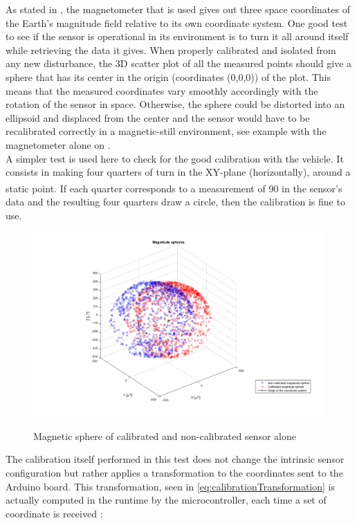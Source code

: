 As stated in , the magnetometer that is used gives out three space coordinates of the Earth's magnitude field relative to its own coordinate system. One good test to see if the sensor is operational in its environment is to turn it all around itself while retrieving the data it gives. When properly calibrated and isolated from any new disturbance, the 3D scatter plot of all the measured points should give a sphere that has its center in the origin (coordinates (0,0,0)) of the plot. This means that the measured coordinates vary smoothly accordingly with the rotation of the sensor in space. Otherwise, the sphere could be distorted into an ellipsoid and displaced from the center and the sensor would have to be recalibrated correctly in a magnetic-still environment, see example with the magnetometer alone on .\\
A simpler test is used here to check for the good calibration with the vehicle. It consists in making four quarters of turn in the XY-plane (horizontally), around a static point. If each quarter corresponds to a measurement of \si{90^{\circ}} in the sensor's data and the resulting four quarters draw a circle, then the calibration is fine to use.
\begin{figure}[H]
    \centering
  {
    \includegraphics[width=1.2\textwidth]{figures/spheresMagnitude.png}
  }
  \caption{Magnetic sphere of calibrated and non-calibrated sensor alone}
  \label{fig:calibrationTestSpheres}
\end{figure}\vspace{-5mm}
%
The calibration itself performed in this test does not change the intrinsic sensor configuration but rather applies a transformation to the coordinates sent to the Arduino board. This transformation, seen in \eqref{eq:calibrationTransformation} is actually computed in the runtime by the microcontroller, each time a set of coordinate is received :
